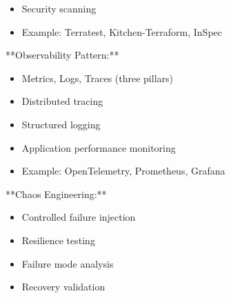 \documentclass[11pt,a4paper]{article}
\begin{document}
\begin{itemize}
\item Security scanning
\end{itemize}

\begin{itemize}
\item Example: Terratest, Kitchen-Terraform, InSpec
\end{itemize}

**Observability Pattern:**

\begin{itemize}
\item Metrics, Logs, Traces (three pillars)
\end{itemize}

\begin{itemize}
\item Distributed tracing
\end{itemize}

\begin{itemize}
\item Structured logging
\end{itemize}

\begin{itemize}
\item Application performance monitoring
\end{itemize}

\begin{itemize}
\item Example: OpenTelemetry, Prometheus, Grafana
\end{itemize}

**Chaos Engineering:**

\begin{itemize}
\item Controlled failure injection
\end{itemize}

\begin{itemize}
\item Resilience testing
\end{itemize}

\begin{itemize}
\item Failure mode analysis
\end{itemize}

\begin{itemize}
\item Recovery validation
\end{itemize}
\end{document}
